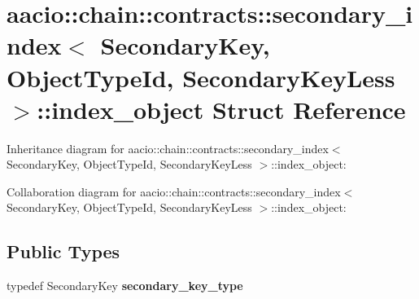 \hypertarget{structaacio_1_1chain_1_1contracts_1_1secondary__index_1_1index__object}{}\section{aacio\+:\+:chain\+:\+:contracts\+:\+:secondary\+\_\+index$<$ Secondary\+Key, Object\+Type\+Id, Secondary\+Key\+Less $>$\+:\+:index\+\_\+object Struct Reference}
\label{structaacio_1_1chain_1_1contracts_1_1secondary__index_1_1index__object}


Inheritance diagram for aacio\+:\+:chain\+:\+:contracts\+:\+:secondary\+\_\+index$<$ Secondary\+Key, Object\+Type\+Id, Secondary\+Key\+Less $>$\+:\+:index\+\_\+object\+:


Collaboration diagram for aacio\+:\+:chain\+:\+:contracts\+:\+:secondary\+\_\+index$<$ Secondary\+Key, Object\+Type\+Id, Secondary\+Key\+Less $>$\+:\+:index\+\_\+object\+:
\subsection*{Public Types}
\begin{DoxyCompactItemize}
\item 
\mbox{\label{structaacio_1_1chain_1_1contracts_1_1secondary__index_1_1index__object_ad4f1c2a14344a343f05be7885b5d3235}} 
typedef Secondary\+Key {\bfseries secondary\+\_\+key\+\_\+type}
\end{DoxyCompactItemize}
